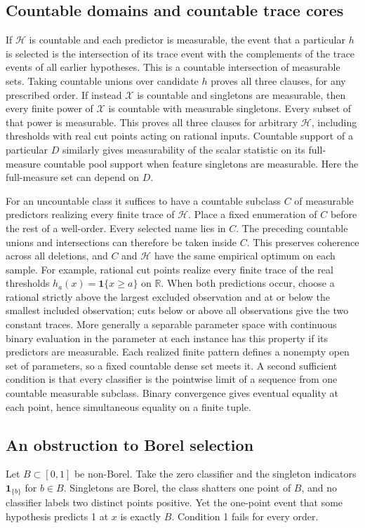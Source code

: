 \documentclass[11pt]{article}
\theoremstyle{definition}\newtheorem{definition}[theorem]{Definition}
\newcommand{\HH}{\mathcal H}
\newcommand{\XX}{\mathcal X}
\newcommand{\ind}{\mathbf 1}
\begin{document}
\subsection{Countable domains and countable trace cores}
If $\HH$ is countable and each predictor is measurable, the event that
a particular $h$ is selected is the intersection of its trace event with
the complements of the trace events of all earlier hypotheses. This
is a countable intersection of measurable sets. Taking countable unions
over candidate $h$ proves all three clauses, for any prescribed order.
If instead $\XX$ is countable and
singletons are measurable, then every finite power of $\XX$ is countable
with measurable singletons. Every subset of that power is measurable.
This proves all three clauses for arbitrary $\HH$, including thresholds
with real cut points acting on rational inputs. Countable support of a
particular $D$ similarly gives measurability of the scalar statistic on its
full-measure countable pool support when feature singletons are measurable.
Here the full-measure set can depend on $D$.

For an uncountable class it suffices to have a countable
subclass $C$ of measurable predictors realizing every finite trace of
$\HH$. Place a fixed enumeration of $C$ before the rest of a well-order.
Every selected name lies in $C$. The preceding countable unions and
intersections can therefore be taken inside $C$. This preserves coherence
across all deletions, and $C$ and $\HH$ have the same empirical optimum
on each sample. For example, rational cut points realize every finite
trace of the real thresholds $h_a(x)=\ind\{x\ge a\}$ on $\mathbb R$.
When both predictions occur, choose a rational strictly above the largest
excluded observation and at or below the smallest included observation;
cuts below or above all observations give the two constant traces.
More generally a separable parameter space with continuous binary
evaluation in the parameter at each instance has this property if its
predictors are measurable. Each realized finite pattern defines a nonempty
open set of parameters, so a fixed countable dense set meets it. A second
sufficient condition is that every classifier is the pointwise limit of a
sequence from one countable measurable subclass. Binary convergence gives
eventual equality at each point, hence simultaneous equality on a finite tuple.

\subsection{An obstruction to Borel selection}
Let $B\subset[0,1]$ be non-Borel. Take the zero classifier and the singleton
indicators $\ind_{\{b\}}$ for $b\in B$. Singletons are Borel, the class
shatters one point of $B$, and no classifier labels two distinct points
positive. Yet the one-point event that some hypothesis predicts 1 at $x$
is exactly $B$. Condition 1 fails for every order.
\end{document}
